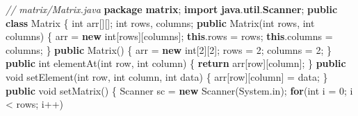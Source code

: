 \documentclass[
  12pt,
]{article}
\newenvironment{Shaded}{}{}
\newcommand{\BuiltInTok}[1]{\textcolor[rgb]{0.00,0.50,0.00}{#1}}
\newcommand{\CommentTok}[1]{\textcolor[rgb]{0.38,0.63,0.69}{\textit{#1}}}
\newcommand{\ControlFlowTok}[1]{\textcolor[rgb]{0.00,0.44,0.13}{\textbf{#1}}}
\newcommand{\DataTypeTok}[1]{\textcolor[rgb]{0.56,0.13,0.00}{#1}}
\newcommand{\DecValTok}[1]{\textcolor[rgb]{0.25,0.63,0.44}{#1}}
\newcommand{\FunctionTok}[1]{\textcolor[rgb]{0.02,0.16,0.49}{#1}}
\newcommand{\ImportTok}[1]{\textcolor[rgb]{0.00,0.50,0.00}{\textbf{#1}}}
\newcommand{\KeywordTok}[1]{\textcolor[rgb]{0.00,0.44,0.13}{\textbf{#1}}}
\newcommand{\NormalTok}[1]{#1}
\newcommand{\OperatorTok}[1]{\textcolor[rgb]{0.40,0.40,0.40}{#1}}
\begin{document}
\begin{Shaded}
\begin{Highlighting}[numbers=left,,]
\CommentTok{// matrix/Matrix.java}
\KeywordTok{package}\ImportTok{ matrix}\OperatorTok{;}
\KeywordTok{import} \ImportTok{java}\OperatorTok{.}\ImportTok{util}\OperatorTok{.}\ImportTok{Scanner}\OperatorTok{;}
\KeywordTok{public} \KeywordTok{class}\NormalTok{ Matrix}
\OperatorTok{\{}
    \DataTypeTok{int}\NormalTok{ arr}\OperatorTok{[][];}
    \DataTypeTok{int}\NormalTok{ rows}\OperatorTok{,}\NormalTok{ columns}\OperatorTok{;}
    \KeywordTok{public} \FunctionTok{Matrix}\OperatorTok{(}\DataTypeTok{int}\NormalTok{ rows}\OperatorTok{,} \DataTypeTok{int}\NormalTok{ columns}\OperatorTok{)}
    \OperatorTok{\{}
\NormalTok{        arr }\OperatorTok{=} \KeywordTok{new} \DataTypeTok{int}\OperatorTok{[}\NormalTok{rows}\OperatorTok{][}\NormalTok{columns}\OperatorTok{];}
        \KeywordTok{this}\OperatorTok{.}\FunctionTok{rows} \OperatorTok{=}\NormalTok{ rows}\OperatorTok{;}
        \KeywordTok{this}\OperatorTok{.}\FunctionTok{columns} \OperatorTok{=}\NormalTok{ columns}\OperatorTok{;}
    \OperatorTok{\}}
    \KeywordTok{public} \FunctionTok{Matrix}\OperatorTok{()}
    \OperatorTok{\{}
\NormalTok{        arr }\OperatorTok{=} \KeywordTok{new} \DataTypeTok{int}\OperatorTok{[}\DecValTok{2}\OperatorTok{][}\DecValTok{2}\OperatorTok{];}
\NormalTok{        rows }\OperatorTok{=} \DecValTok{2}\OperatorTok{;}
\NormalTok{        columns }\OperatorTok{=} \DecValTok{2}\OperatorTok{;}
    \OperatorTok{\}}
    \KeywordTok{public} \DataTypeTok{int} \FunctionTok{elementAt}\OperatorTok{(}\DataTypeTok{int}\NormalTok{ row}\OperatorTok{,} \DataTypeTok{int}\NormalTok{ column}\OperatorTok{)}
    \OperatorTok{\{}
        \ControlFlowTok{return}\NormalTok{ arr}\OperatorTok{[}\NormalTok{row}\OperatorTok{][}\NormalTok{column}\OperatorTok{];}
    \OperatorTok{\}}
    \KeywordTok{public} \DataTypeTok{void} \FunctionTok{setElement}\OperatorTok{(}\DataTypeTok{int}\NormalTok{ row}\OperatorTok{,} \DataTypeTok{int}\NormalTok{ column}\OperatorTok{,} \DataTypeTok{int}\NormalTok{ data}\OperatorTok{)}
    \OperatorTok{\{}
\NormalTok{        arr}\OperatorTok{[}\NormalTok{row}\OperatorTok{][}\NormalTok{column}\OperatorTok{]} \OperatorTok{=}\NormalTok{ data}\OperatorTok{;}
    \OperatorTok{\}}
    \KeywordTok{public} \DataTypeTok{void} \FunctionTok{setMatrix}\OperatorTok{()}
    \OperatorTok{\{}
        \BuiltInTok{Scanner}\NormalTok{ sc }\OperatorTok{=} \KeywordTok{new} \BuiltInTok{Scanner}\OperatorTok{(}\BuiltInTok{System}\OperatorTok{.}\FunctionTok{in}\OperatorTok{);}
        \ControlFlowTok{for}\OperatorTok{(}\DataTypeTok{int}\NormalTok{ i }\OperatorTok{=} \DecValTok{0}\OperatorTok{;}\NormalTok{ i }\OperatorTok{\textless{}}\NormalTok{ rows}\OperatorTok{;}\NormalTok{ i}\OperatorTok{++)}

\end{Highlighting}
\end{Shaded}
\end{document}
